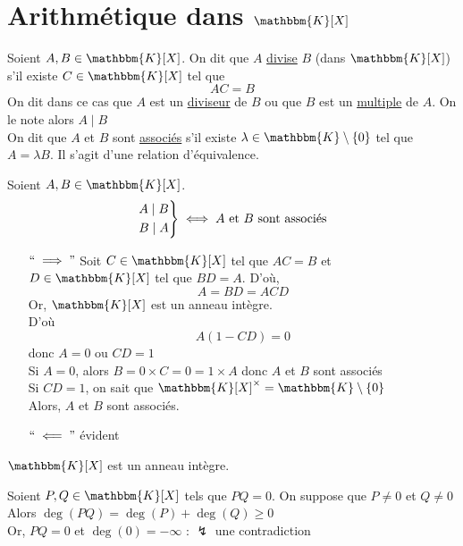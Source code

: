 \part{Arithmétique dans $\mathbbm{K}[X]$}

\begin{defn}
	Soient $A,B \in \mathbbm{K}[X]$. On dit que $A$ \underline{divise} $B$ (dans $\mathbbm{K}[X]$) s'il existe $C \in \mathbbm{K}[X]$ tel que \[
		AC = B
	\] On dit dans ce cas que $A$ est un \underline{diviseur} de $B$ ou que $B$ est un \underline{multiple} de $A$. On le note alors $A \mid B$\\
	On dit que $A$ et $B$ sont \underline{associés} s'il existe $\lambda \in \mathbbm{K} \setminus \{0\}$ tel que $A = \lambda B$. Il s'agit d'une relation d'équivalence.
\end{defn}

\begin{prop}
	Soient $A,B \in \mathbbm{K}[X]$.
	\[
		\begin{rcases*}
			A  \mid B\\
			B  \mid A
		\end{rcases*}
		\iff A \text{ et } B \text{ sont associés}
	\] 
\end{prop}

\begin{prv}
	\begin{itemize}
		\item[$``\implies"$] Soit $C \in \mathbbm{K}[X]$ tel que $AC = B$ et $D \in \mathbbm{K}[X]$ tel que $BD = A$. D'où,  \[
				A = BD = ACD
			\] Or, $\mathbbm{K}[X]$ est un anneau intègre.\\
			D'où \[
				A (1-CD) = 0
			\] donc $A = 0$ ou $CD = 1$\\
			Si $A = 0$, alors $B = 0 \times C = 0 = 1\times A$ donc $A$ et $B$ sont associés\\
			Si $CD = 1$, on sait que $\mathbbm{K}[X]^\times = \mathbbm{K}\setminus \{0\}$\\
			Alors, $A$ et $B$ sont associés.
		\item[$``\impliedby"$] évident
	\end{itemize}
\end{prv}

\begin{lem}
	$\mathbbm{K}[X]$ est un anneau intègre.
\end{lem}

\begin{prv}
	Soient $P,Q \in \mathbbm{K}[X]$ tels que $PQ = 0$. On suppose que $P \neq 0$ et $Q \neq 0$ \\
	Alors $\deg(PQ) = \deg(P) + \deg(Q) \ge 0$ \\
	Or, $PQ = 0$ et $\deg(0) = -\infty$ : $\lightning$ une contradiction
\end{prv}

